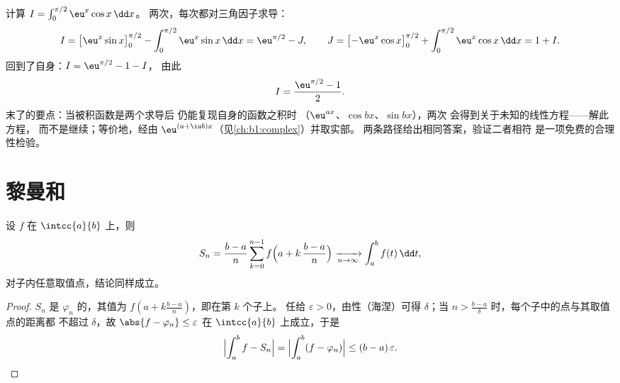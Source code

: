\begin{example}[回旋镖积分]\label{ex:b1:integration:boomerang}
计算 $I = \int_0^{\pi/2} \eu^x \cos x\,\dd x$。
两次，每次都对三角因子求导：
\[
I = \bigl[\eu^x \sin x\bigr]_0^{\pi/2}
- \int_0^{\pi/2} \eu^x \sin x\,\dd x
= \eu^{\pi/2} - J,
\qquad
J = \bigl[-\eu^x\cos x\bigr]_0^{\pi/2}
+ \int_0^{\pi/2} \eu^x\cos x\,\dd x = 1 + I .
\]
回到了自身：$I = \eu^{\pi/2} - 1 - I$，
由此
\[
I = \frac{\eu^{\pi/2} - 1}{2} .
\]
末了的要点：当被积函数是两个求导后
仍能复现自身的函数之积时
（$\eu^{ax}$、$\cos bx$、$\sin bx$），两次
会得到关于未知的线性方程——解此方程，
而不是继续；等价地，经由
$\eu^{(a + \iu b)x}$（见\cref{ch:b1:complex}）并取实部。
两条路径给出相同答案，验证二者相符
是一项免费的合理性检验。
\end{example}

\section{黎曼和}

\begin{theorem}[黎曼和]\label{thm:b1:integration:riemann}
设 $f$ 在 $\intcc{a}{b}$ 上，则
\[
S_n = \frac{b - a}{n} \sum_{k=0}^{n-1}
f\Bigl(a + k\,\frac{b-a}{n}\Bigr)
\xrightarrow[n \to \infty]{} \int_a^b f(t)\, \dd t ,
\]
对子内任意取值点，结论同样成立。
\end{theorem}

\begin{proof}
$S_n$ 是 $\varphi_n$ 的，其值为
$f(a + k\frac{b-a}{n})$，即在第 $k$ 个子上。
任给 $\varepsilon > 0$，由性（海涅）可得 $\delta$；当
$n > \frac{b-a}{\delta}$ 时，每个子中的点与其取值点的距离都
不超过 $\delta$，故 $\abs{f - \varphi_n} \leq
\varepsilon$ 在 $\intcc{a}{b}$ 上成立，于是
\[
\Bigl| \int_a^b f - S_n \Bigr|
= \Bigl| \int_a^b (f - \varphi_n) \Bigr|
\leq (b-a)\,\varepsilon . \qedhere
\]
\end{proof}

